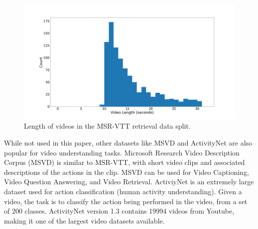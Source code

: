 \begin{figure}
      \centering
      \includegraphics[width=\textwidth]{figures/msr-vtt-length-histogram.png}
      \caption{Length of videos in the MSR-VTT retrieval data split.}
      \label{fig:length_histogram}
\end{figure}

While not used in this paper, other datasets like MSVD \cite{msvd} and ActivityNet \cite{activitynet} are also popular for video understanding tasks.
Microsoft Research Video Description Corpus (MSVD) is similar to MSR-VTT, with short video clips and associated descriptions of the actions in the clip.
MSVD can be used for Video Captioning, Video Question Answering, and Video Retrieval.
ActiviyNet is an extremely large dataset used for action classification (human activity understanding).
Given a video, the task is to classify the action being performed in the video, from a set of 200 classes.
ActivityNet version 1.3 contains 19994 videos from Youtube, making it one of the largest video datasets available.
